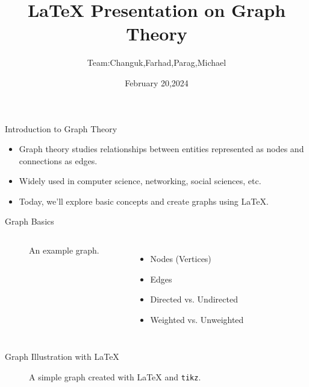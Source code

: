 \documentclass{beamer}
\title{\LaTeX{} Presentation on Graph Theory}
\author{Team:Changuk,Farhad,Parag,Michael }
\date{February 20,2024}
\begin{document}
\frame{\titlepage}
\begin{frame}{Introduction to Graph Theory}
    \begin{itemize}
        \item Graph theory studies relationships between entities represented as nodes and connections as edges.
        \item Widely used in computer science, networking, social sciences, etc.
        \item Today, we'll explore basic concepts and create graphs using \LaTeX.
    \end{itemize}
\end{frame}

\begin{frame}{Graph Basics}
    \begin{columns}
        \begin{figure}
            \caption{An example graph.}
        \end{figure}
        \begin{itemize}
            \item Nodes (Vertices)
            \item Edges
            \item Directed vs. Undirected
            \item Weighted vs. Unweighted
        \end{itemize}
    \end{columns}
\end{frame}

\begin{frame}{Graph Illustration with \LaTeX}
    \begin{figure}
        \caption{A simple graph created with \LaTeX{} and \texttt{tikz}.}
    \end{figure}
\end{frame}
\end{document}
